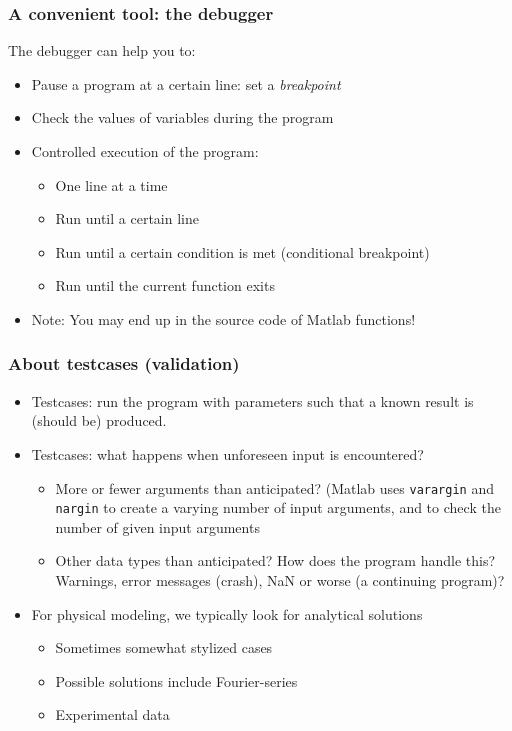 \documentclass[11pt,table,final,fleqn,xcolor={usenames,dvipsnames}]{beamer}
\begin{document}
\begin{frame}
\frametitle{A convenient tool: the debugger}
The debugger can help you to:
\begin{itemize}
  \item Pause a program at a certain line: set a \emph{breakpoint}
  \item Check the values of variables during the program
  \item Controlled execution of the program:
  \begin{itemize}
    \item One line at a time
    \item Run until a certain line
    \item Run until a certain condition is met (conditional breakpoint)
    \item Run until the current function exits
  \end{itemize}
  \item Note: You may end up in the source code of Matlab functions!
\end{itemize}
\end{frame}
% 
\begin{frame}
  \frametitle{About testcases (validation)}
  \begin{itemize}
    \item Testcases: run the program with parameters such that a known result is (should be) produced.
    \item Testcases: what happens when unforeseen input is encountered?
    \begin{itemize}
      \item More or fewer arguments than anticipated? (Matlab uses \lstinline$varargin$ and \lstinline$nargin$ to create a varying number of input arguments, and to check the number of given input arguments
      \item Other data types than anticipated? How does the program handle this? Warnings, error messages (crash), NaN or worse (a continuing program)?
    \end{itemize}
    \item For physical modeling, we typically look for analytical solutions
    \begin{itemize}
      \item Sometimes somewhat stylized cases
      \item Possible solutions include Fourier-series
      \item Experimental data
    \end{itemize}

  \end{itemize}
\end{frame}
\end{document}
